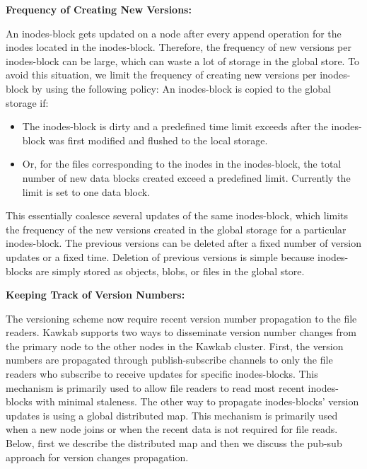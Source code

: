 \documentclass[]{article}
\newcommand{\subtopic}[1]{\vspace{1.5pt} \noindent \textbf{#1}}
\begin{document}
\subtopic{Frequency of Creating New Versions:}

An inodes-block gets  updated on a node after every append operation for the
inodes located in the inodes-block. Therefore, the frequency of new versions
per inodes-block can be large, which can waste a lot of storage in the global
store.  To avoid this situation, we limit the frequency of creating new
versions per inodes-block by using the following policy: An inodes-block is
copied to the global storage if:

\begin{itemize}

\item The inodes-block is dirty and a predefined time limit exceeds after the
      inodes-block was first modified and flushed to the local storage.

\item Or, for the files corresponding to the inodes in the inodes-block, 
      the total number of new data blocks created exceed a predefined limit.
      Currently the limit is set to one data block.

\end{itemize}

This essentially coalesce several updates of the same inodes-block, which limits
the frequency of the new versions created in the global storage for a particular
inodes-block. The previous versions can be deleted after a fixed number of
version updates or a fixed time. Deletion of previous versions is simple
because inodes-blocks are simply stored as objects, blobs, or files in the
global store.


\subtopic{Keeping Track of Version Numbers:}

The versioning scheme now require recent version number propagation to the file
readers. Kawkab supports two ways to disseminate version number changes from
the primary node to the other nodes in the Kawkab cluster. First, the version
numbers are propagated through publish-subscribe channels to only the file
readers who subscribe to receive updates for specific inodes-blocks.  This
mechanism is primarily used to allow file readers to read most recent
inodes-blocks with minimal staleness. The other way to propagate inodes-blocks'
version updates is using a global distributed map. This mechanism is primarily
used when a new node joins or when the recent data is not required for file
reads. Below, first we describe the distributed map and then we discuss the
pub-sub approach for version changes propagation.
\end{document}
